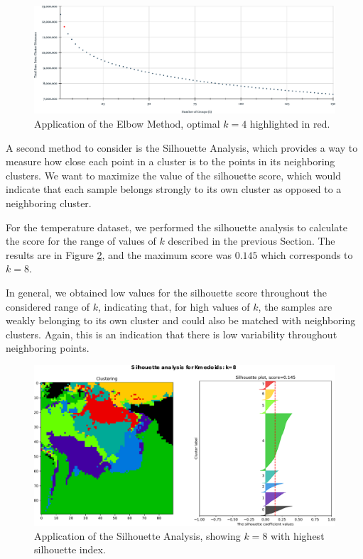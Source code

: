 \begin{figure}[h]
	\centering
	\includegraphics[scale=0.5]{../Figures/Elbow-Kmedoids}
	\caption{Application of the Elbow Method, optimal $k=4$ highlighted in red.}
	\label{Fig:SSE-kMedoids}
\end{figure}

A second method to consider is the Silhouette Analysis, which provides a way to measure how close each point in a cluster is to the points in its neighboring clusters. We want to maximize the value of the silhouette score, which would indicate that each sample belongs strongly to its own cluster as opposed to a neighboring cluster.

For the temperature dataset, we performed the silhouette analysis to calculate the score for the range of values of $k$ described in the previous Section. The results are in Figure \ref{Fig:Silhouette-kMedoids}, and the maximum score was $0.145$ which corresponds to $k = 8$. 

In general, we obtained low values for the silhouette score throughout the considered range of $k$, indicating that, for high values of $k$, the samples are weakly belonging to its own cluster and could also be matched with neighboring clusters. Again, this is an indication that there is low variability throughout neighboring points.

\begin{figure}[h]
	\centering
	\includegraphics[scale=0.50]{../Figures/silhouette-kmedoids_k8_seed0_lite}
	\caption{Application of the Silhouette Analysis, showing $k=8$ with highest silhouette index.}
	\label{Fig:Silhouette-kMedoids}
\end{figure}

